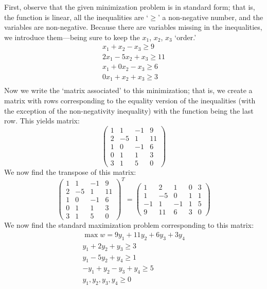 \documentclass[12pt,letterpaper]{exam}
\begin{document}
\begin{questions}
\sol First, observe that the given minimization problem is in standard form; that is, the function is linear, all the inequalities are `$\geq$' a non-negative number, and the variables are non-negative. Because there are variables missing in the inequalities, we introduce them---being sure to keep the $x_1$, $x_2$, $x_3$ `order.' 
	\[
	\begin{gathered}
	x_1 + x_2 - x_3 \geq 9 \\
	2x_1 - 5x_2 + x_3 \geq 11 \\
	x_1 + 0x_2 - x_3 \geq 6 \\
	0x_1 + x_2 + x_3 \geq 3 \\
	\end{gathered}
	\] 
Now we write the `matrix associated' to this minimization; that is, we create a matrix with rows corresponding to the equality version of the inequalities (with the exception of the non-negativity inequality) with the function being the last row. This yields matrix:
	\[
	\begin{pmatrix}
	1 & 1 & -1 & 9 \\
	2 & -5 & 1 & 11 \\
	1 & 0 & -1 & 6 \\
	0 & 1 & 1 & 3 \\
	3 & 1 & 5 & 0 
	\end{pmatrix}
	\]
We now find the transpose of this matrix: 
	\[
	\begin{pmatrix}
	1 & 1 & -1 & 9 \\
	2 & -5 & 1 & 11 \\
	1 & 0 & -1 & 6 \\
	0 & 1 & 1 & 3 \\
	3 & 1 & 5 & 0 
	\end{pmatrix}^T= 
	\begin{pmatrix}
	1 & 2 & 1 & 0 & 3 \\
	1 & -5 & 0 & 1 & 1 \\
	-1 & 1 & -1 & 1 & 5 \\
	9 & 11 & 6 & 3 & 0 
	\end{pmatrix}
	\]
We now find the standard maximization problem corresponding to this matrix:
	\[
	\begin{gathered}
	\max w= 9y_1 + 11y_2 + 6y_3 + 3y_4 \\
	y_1 + 2y_2 + y_3 \geq 3 \\
	y_1 - 5y_2 + y_4 \geq 1 \\
	-y_1 + y_2 - y_3 + y_4 \geq 5 \\
	y_1, y_2, y_3, y_4 \geq 0 
	\end{gathered}
	\] 


\end{questions}
\end{document}

